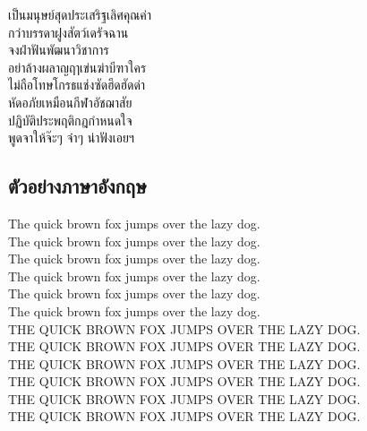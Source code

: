 \documentclass[twocolumn,a4paper]{article}
\begin{document}
เป็นมนุษย์สุดประเสริฐเลิศคุณค่า\\
กว่าบรรดาฝูงสัตว์เดรัจฉาน \\
จงฝ่าฟันพัฒนาวิชาการ \\
อย่าล้างผลาญฤๅเข่นฆ่าบีฑาใคร\\ 
ไม่ถือโทษโกรธแช่งซัดฮึดฮัดด่า \\
หัดอภัยเหมือนกีฬาอัชฌาสัย \\
ปฏิบัติประพฤติกฎกำหนดใจ \\
พูดจาให้จ๊ะๆ จ๋าๆ น่าฟังเอยฯ\\ 

\subsection{ตัวอย่างภาษาอังกฤษ}
The quick brown fox jumps over the lazy dog.\\
The quick brown fox jumps over the lazy dog.\\
The quick brown fox jumps over the lazy dog.\\
The quick brown fox jumps over the lazy dog.\\
The quick brown fox jumps over the lazy dog.\\
The quick brown fox jumps over the lazy dog.\\
\MakeUppercase{The quick brown fox jumps over the lazy dog.}\\
\MakeUppercase{The quick brown fox jumps over the lazy dog.}\\
\MakeUppercase{The quick brown fox jumps over the lazy dog.}\\
\MakeUppercase{The quick brown fox jumps over the lazy dog.}\\
\MakeUppercase{The quick brown fox jumps over the lazy dog.}\\
\MakeUppercase{The quick brown fox jumps over the lazy dog.}\\
\end{document}
